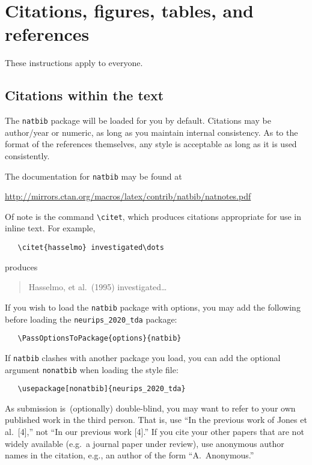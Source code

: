 \documentclass{article}
\begin{document}
\section{Citations, figures, tables, and references}
\label{sec:Others}

These instructions apply to everyone.

\subsection{Citations within the text}

The \verb+natbib+ package will be loaded for you by default.  Citations may be
author/year or numeric, as long as you maintain internal consistency.  As to the
format of the references themselves, any style is acceptable as long as it is
used consistently.

The documentation for \verb+natbib+ may be found at
\begin{center}
  \url{http://mirrors.ctan.org/macros/latex/contrib/natbib/natnotes.pdf}
\end{center}
Of note is the command \verb+\citet+, which produces citations appropriate for
use in inline text.  For example,
\begin{verbatim}
   \citet{hasselmo} investigated\dots
\end{verbatim}
produces
\begin{quote}
  Hasselmo, et al.\ (1995) investigated\dots
\end{quote}
%
If you wish to load the \verb+natbib+ package with options, you may add the
following before loading the \verb+neurips_2020_tda+ package:
\begin{verbatim}
   \PassOptionsToPackage{options}{natbib}
\end{verbatim}

If \verb+natbib+ clashes with another package you load, you can add the optional
argument \verb+nonatbib+ when loading the style file:
\begin{verbatim}
   \usepackage[nonatbib]{neurips_2020_tda}
\end{verbatim}

As submission is~(optionally) double-blind, you may want to refer to
your own published work in the third person. That is, use ``In the
previous work of Jones et al.\ [4],'' not ``In our previous work [4].''
If you cite your other papers that are not widely available (e.g.\
a journal paper under review), use anonymous author names in the
citation, e.g., an author of the form ``A.\ Anonymous.''
\end{document}
